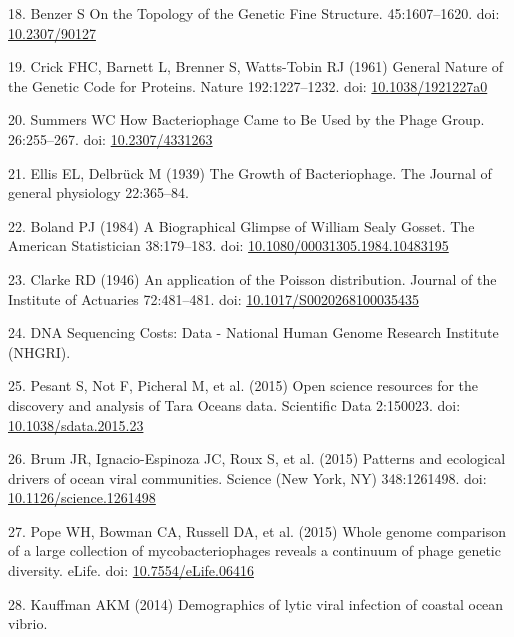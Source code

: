 \documentclass[12pt,twoside]{mitthesis-manusdown}
\begin{document}
\hypertarget{ref-Benzera}{}
18. Benzer S On the Topology of the Genetic Fine Structure.
45:1607--1620. doi: \href{https://doi.org/10.2307/90127}{10.2307/90127}

\hypertarget{ref-CRICK1961}{}
19. Crick FHC, Barnett L, Brenner S, Watts-Tobin RJ (1961) General
Nature of the Genetic Code for Proteins. Nature 192:1227--1232. doi:
\href{https://doi.org/10.1038/1921227a0}{10.1038/1921227a0}

\hypertarget{ref-Summers}{}
20. Summers WC How Bacteriophage Came to Be Used by the Phage Group.
26:255--267. doi:
\href{https://doi.org/10.2307/4331263}{10.2307/4331263}

\hypertarget{ref-Ellis1939}{}
21. Ellis EL, Delbrück M (1939) The Growth of Bacteriophage. The Journal
of general physiology 22:365--84.

\hypertarget{ref-Boland1984}{}
22. Boland PJ (1984) A Biographical Glimpse of William Sealy Gosset. The
American Statistician 38:179--183. doi:
\href{https://doi.org/10.1080/00031305.1984.10483195}{10.1080/00031305.1984.10483195}

\hypertarget{ref-Clarke1946}{}
23. Clarke RD (1946) An application of the Poisson distribution. Journal
of the Institute of Actuaries 72:481--481. doi:
\href{https://doi.org/10.1017/S0020268100035435}{10.1017/S0020268100035435}

\hypertarget{ref-sequencingcosts}{}
24. DNA Sequencing Costs: Data - National Human Genome Research
Institute (NHGRI).

\hypertarget{ref-Pesant2015}{}
25. Pesant S, Not F, Picheral M, et al. (2015) Open science resources
for the discovery and analysis of Tara Oceans data. Scientific Data
2:150023. doi:
\href{https://doi.org/10.1038/sdata.2015.23}{10.1038/sdata.2015.23}

\hypertarget{ref-Brum2015}{}
26. Brum JR, Ignacio-Espinoza JC, Roux S, et al. (2015) Patterns and
ecological drivers of ocean viral communities. Science (New York, NY)
348:1261498. doi:
\href{https://doi.org/10.1126/science.1261498}{10.1126/science.1261498}

\hypertarget{ref-Pope2015}{}
27. Pope WH, Bowman CA, Russell DA, et al. (2015) Whole genome
comparison of a large collection of mycobacteriophages reveals a
continuum of phage genetic diversity. eLife. doi:
\href{https://doi.org/10.7554/eLife.06416}{10.7554/eLife.06416}

\hypertarget{ref-Kauffman2014}{}
28. Kauffman AKM (2014) Demographics of lytic viral infection of coastal
ocean vibrio.
\end{document}
